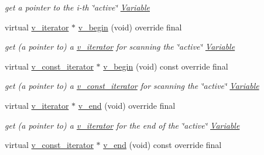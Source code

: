 \begin{Indent}
\begin{DoxyCompactItemize}
\begin{DoxyCompactList}\small\item\em get a pointer to the i-\/th \char`\"{}active\char`\"{} \mbox{\hyperlink{class_s_m_spp__di__unipi__it_1_1_variable}{Variable}} \end{DoxyCompactList}\item 
virtual \mbox{\hyperlink{class_s_m_spp__di__unipi__it_1_1_linear_function_1_1v__iterator}{v\+\_\+iterator}} $\ast$ \mbox{\hyperlink{class_s_m_spp__di__unipi__it_1_1_linear_function_ab1aaddfcb091477a729de24cd07ad9e5}{v\+\_\+begin}} (void) override final
\begin{DoxyCompactList}\small\item\em get (a pointer to) a \mbox{\hyperlink{class_s_m_spp__di__unipi__it_1_1_linear_function_1_1v__iterator}{v\+\_\+iterator}} for scanning the \char`\"{}active\char`\"{} \mbox{\hyperlink{class_s_m_spp__di__unipi__it_1_1_variable}{Variable}} \end{DoxyCompactList}\item 
virtual \mbox{\hyperlink{class_s_m_spp__di__unipi__it_1_1_linear_function_1_1v__const__iterator}{v\+\_\+const\+\_\+iterator}} $\ast$ \mbox{\hyperlink{class_s_m_spp__di__unipi__it_1_1_linear_function_a70fe7515b94b3bb0c315ed6794f97a9a}{v\+\_\+begin}} (void) const override final
\begin{DoxyCompactList}\small\item\em get (a pointer to) a \mbox{\hyperlink{class_s_m_spp__di__unipi__it_1_1_linear_function_1_1v__const__iterator}{v\+\_\+const\+\_\+iterator}} for scanning the \char`\"{}active\char`\"{} \mbox{\hyperlink{class_s_m_spp__di__unipi__it_1_1_variable}{Variable}} \end{DoxyCompactList}\item 
virtual \mbox{\hyperlink{class_s_m_spp__di__unipi__it_1_1_linear_function_1_1v__iterator}{v\+\_\+iterator}} $\ast$ \mbox{\hyperlink{class_s_m_spp__di__unipi__it_1_1_linear_function_a84a680d911c65c059b67cfeb63815e29}{v\+\_\+end}} (void) override final
\begin{DoxyCompactList}\small\item\em get (a pointer to) a \mbox{\hyperlink{class_s_m_spp__di__unipi__it_1_1_linear_function_1_1v__iterator}{v\+\_\+iterator}} for the end of the \char`\"{}active\char`\"{} \mbox{\hyperlink{class_s_m_spp__di__unipi__it_1_1_variable}{Variable}} \end{DoxyCompactList}\item 
virtual \mbox{\hyperlink{class_s_m_spp__di__unipi__it_1_1_linear_function_1_1v__const__iterator}{v\+\_\+const\+\_\+iterator}} $\ast$ \mbox{\hyperlink{class_s_m_spp__di__unipi__it_1_1_linear_function_abb9e25cdff71595b6c21f36db96242b0}{v\+\_\+end}} (void) const override final

\end{DoxyCompactItemize}
\end{Indent}
